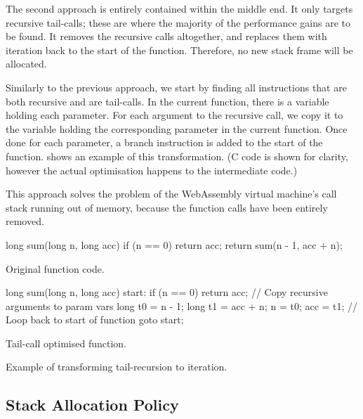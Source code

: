 \documentclass[00-main.tex]{subfiles}
\begin{document}
The second approach is entirely contained within the middle end.
It only targets recursive tail-calls; these are where the majority of the performance gains are to be found.
It removes the recursive calls altogether, and replaces them with iteration back to the start of the function.
Therefore, no new stack frame will be allocated.

Similarly to the previous approach, we start by finding all  instructions that are both recursive and are tail-calls.
In the current function, there is a variable holding each parameter.
For each argument to the recursive call, we copy it to the variable holding the corresponding parameter in the current function.
Once done for each parameter, a branch instruction is added to the start of the function.
 shows an example of this transformation.
(C code is shown for clarity, however the actual optimisation happens to the intermediate code.)

This approach solves the problem of the WebAssembly virtual machine's call stack running out of memory, because the function calls have been entirely removed.

\begin{listing}[t]
  \begin{sublisting}[b]{0.49\textwidth}
    \begin{CListing}
      long sum(long n, long acc) {
          if (n == 0) {
              return acc;
          }
          return sum(n - 1, acc + n);
      }
    \end{CListing}
    \caption{Original function code.}
  \end{sublisting}
  \hfill
  \begin{sublisting}[b]{0.49\textwidth}
    \begin{CListing}
      long sum(long n, long acc) {
      start:
          if (n == 0) {
              return acc;
          }
          // Copy recursive arguments to param vars
          long t0 = n - 1;
          long t1 = acc + n;
          n = t0;
          acc = t1;
          // Loop back to start of function
          goto start;
      }
    \end{CListing}
    \caption{Tail-call optimised function.}
  \end{sublisting}
  \caption{Example of transforming tail-recursion to iteration.}
  \label{lst:tail-call optimisation example}
\end{listing}


\subsection{Stack Allocation Policy}\label{sec:impl:optimised stack allocation}
\end{document}
